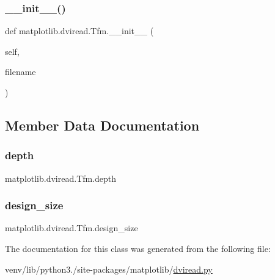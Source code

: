 \subsubsection{\texorpdfstring{\+\_\+\+\_\+init\+\_\+\+\_\+()}{\_\_init\_\_()}}
{\footnotesize\ttfamily def matplotlib.\+dviread.\+Tfm.\+\_\+\+\_\+init\+\_\+\+\_\+ (\begin{DoxyParamCaption}\item[{}]{self,  }\item[{}]{filename }\end{DoxyParamCaption})}



\subsection{Member Data Documentation}
\mbox{\label{classmatplotlib_1_1dviread_1_1Tfm_a27ea271b7e2e098a9fc29fe79c09e3aa}} 
\subsubsection{\texorpdfstring{depth}{depth}}
{\footnotesize\ttfamily matplotlib.\+dviread.\+Tfm.\+depth}

\mbox{\label{classmatplotlib_1_1dviread_1_1Tfm_a283e26b9669ee08c83c0bf512d92f751}} 
\subsubsection{\texorpdfstring{design\+\_\+size}{design\_size}}
{\footnotesize\ttfamily matplotlib.\+dviread.\+Tfm.\+design\+\_\+size}



The documentation for this class was generated from the following file\+:\begin{DoxyCompactItemize}
\item 
venv/lib/python3./site-\/packages/matplotlib/\hyperlink{dviread_8py}{dviread.\+py}\end{DoxyCompactItemize}
